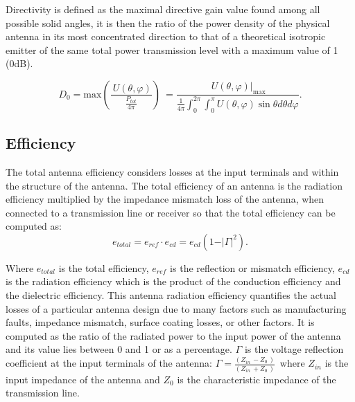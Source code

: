 Directivity is defined as the maximal directive gain value found among all possible solid angles, it is then the ratio of the power density of the physical antenna in its most concentrated direction to that of a theoretical isotropic emitter of the same total power transmission level with a maximum value of 1 (0dB).

\begin{equation}
D_{0} = \mbox{max} \left( \frac{~U \left(  \theta , \varphi  \right) }{\frac{P_{tot}}{4 \pi }} \right) ~=\frac{~  U \left(  \theta , \varphi  \right)  \vert_{\max }}{\frac{1}{4 \pi } \int_{0}^{2 \pi } \int _{0}^{ \pi }U \left(  \theta , \varphi  \right) \sin  \theta d \theta d \varphi }.
\end{equation}








\subsection{Efficiency}

The total antenna efficiency considers losses at the input terminals and within the structure of the antenna. The total efficiency of an antenna is the radiation efficiency multiplied by the impedance mismatch loss of the antenna, when connected to a transmission line or receiver so that the total efficiency can be computed as:
\begin{equation}
e_{total}= e_{ref} \cdot e_{cd}= e_{cd} \left( 1- \vert  \Gamma  \vert ^{2} \right).
\end{equation}

Where $e_{total}$ is the total efficiency, $e_{ref}$ is the reflection or mismatch efficiency, $e_{cd}$ is the radiation efficiency which is the product of the conduction efficiency and the dielectric efficiency. This antenna radiation efficiency quantifies the actual losses of a particular antenna design due to many factors such as manufacturing faults, impedance mismatch, surface coating losses, or other factors. It is computed as the ratio of the radiated power to the input power of the antenna and its value lies between 0 and 1 or as a percentage. $\Gamma$ is the voltage reflection coefficient at the input terminals of the antenna:  $\Gamma =\frac{ \left( Z_{in~}- Z_{0~} \right) }{ \left( Z_{in~}+ Z_{0~} \right) }$\  where  $Z_{in}$ is the input impedance of the antenna and  $Z_{0}$ is the characteristic impedance of the transmission line.

